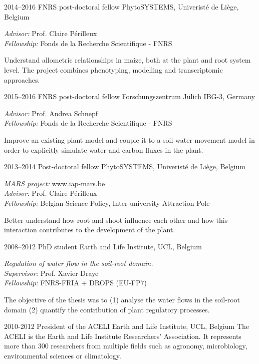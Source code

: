 \documentclass[]{friggeri-cv} %
\begin{document}
\begin{entrylist}

\entry
{2014--2016}
{FNRS post-doctoral fellow}
{PhytoSYSTEMS, Univeristé de Liège, Belgium}
{\emph{Advisor:} Prof. Claire Périlleux \\
\emph{Fellowship:} Fonds de la Recherche Scientifique - FNRS
\vspace{5pt}

Understand allometric relationships in maize, both at the plant and root system level. The project combines phenotyping, modelling and transcriptomic approaches.
\\}
\entry
{2015--2016}
{FNRS post-doctoral fellow}
{Forschungszentrum Jülich IBG-3, Germany}
{\emph{Advisor:} Prof. Andrea Schnepf \\
\emph{Fellowship:} Fonds de la Recherche Scientifique - FNRS
\vspace{5pt}

Improve an existing plant model and couple it to a soil water movement model in order to explicitly simulate water and carbon fluxes in the plant.
\\}%

\entry
{2013--2014}
{Post-doctoral fellow}
{PhytoSYSTEMS, Univeristé de Liège, Belgium}
{\emph{MARS project:} \href{http://www.iap-mars.be}{www.iap-mars.be} \\
\emph{Advisor:} Prof. Claire Périlleux \\
\emph{Fellowship:} Belgian Science Policy, Inter-university Attraction Pole
\vspace{5pt}

Better understand how root and shoot influence each other and how this interaction contributes to the development of the plant.
\\}
\entry
{2008--2012}
{PhD student}
{Earth and Life Institute, UCL, Belgium}
{\emph{Regulation of water flow in the soil-root domain.}\\
\emph{Supervisor:} Prof. Xavier Draye\\
\emph{Fellowship:} FNRS-FRIA + DROPS (EU-FP7)
\vspace{5pt}

The objective of the thesis was to (1) analyse the water flows in the soil-root domain (2) quantify the contribution of plant regulatory processes. \\}

\entry
{2010-2012}
{President of the ACELI}
{Earth and Life Institute, UCL, Belgium}
{The ACELI is the Earth and Life Institute Researchers' Association. It represents more than 300 researchers from multiple fields such as agronomy, microbiology, environmental sciences or climatology.}

\end{entrylist}
\end{document}
